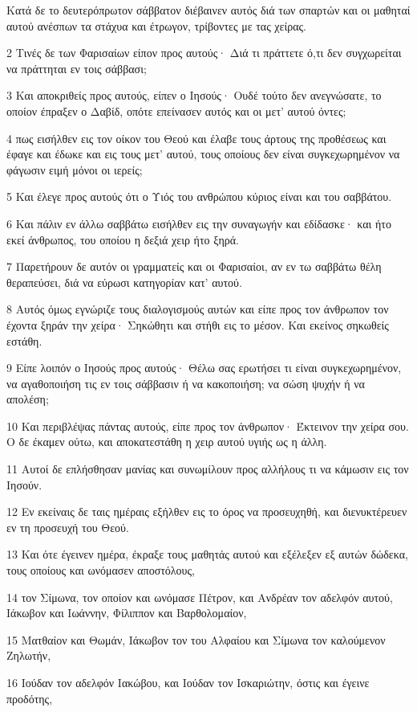 \par Κατά δε το δευτερόπρωτον σάββατον διέβαινεν αυτός διά των σπαρτών και οι μαθηταί αυτού ανέσπων τα στάχυα και έτρωγον, τρίβοντες με τας χείρας.
\par 2 Τινές δε των Φαρισαίων είπον προς αυτούς· Διά τι πράττετε ό,τι δεν συγχωρείται να πράττηται εν τοις σάββασι;
\par 3 Και αποκριθείς προς αυτούς, είπεν ο Ιησούς· Ουδέ τούτο δεν ανεγνώσατε, το οποίον έπραξεν ο Δαβίδ, οπότε επείνασεν αυτός και οι μετ' αυτού όντες;
\par 4 πως εισήλθεν εις τον οίκον του Θεού και έλαβε τους άρτους της προθέσεως και έφαγε και έδωκε και εις τους μετ' αυτού, τους οποίους δεν είναι συγκεχωρημένον να φάγωσιν ειμή μόνοι οι ιερείς;
\par 5 Και έλεγε προς αυτούς ότι ο Υιός του ανθρώπου κύριος είναι και του σαββάτου.
\par 6 Και πάλιν εν άλλω σαββάτω εισήλθεν εις την συναγωγήν και εδίδασκε· και ήτο εκεί άνθρωπος, του οποίου η δεξιά χειρ ήτο ξηρά.
\par 7 Παρετήρουν δε αυτόν οι γραμματείς και οι Φαρισαίοι, αν εν τω σαββάτω θέλη θεραπεύσει, διά να εύρωσι κατηγορίαν κατ' αυτού.
\par 8 Αυτός όμως εγνώριζε τους διαλογισμούς αυτών και είπε προς τον άνθρωπον τον έχοντα ξηράν την χείρα· Σηκώθητι και στήθι εις το μέσον. Και εκείνος σηκωθείς εστάθη.
\par 9 Είπε λοιπόν ο Ιησούς προς αυτούς· Θέλω σας ερωτήσει τι είναι συγκεχωρημένον, να αγαθοποιήση τις εν τοις σάββασιν ή να κακοποιήση; να σώση ψυχήν ή να απολέση;
\par 10 Και περιβλέψας πάντας αυτούς, είπε προς τον άνθρωπον· Έκτεινον την χείρα σου. Ο δε έκαμεν ούτω, και αποκατεστάθη η χειρ αυτού υγιής ως η άλλη.
\par 11 Αυτοί δε επλήσθησαν μανίας και συνωμίλουν προς αλλήλους τι να κάμωσιν εις τον Ιησούν.
\par 12 Εν εκείναις δε ταις ημέραις εξήλθεν εις το όρος να προσευχηθή, και διενυκτέρευεν εν τη προσευχή του Θεού.
\par 13 Και ότε έγεινεν ημέρα, έκραξε τους μαθητάς αυτού και εξέλεξεν εξ αυτών δώδεκα, τους οποίους και ωνόμασεν αποστόλους,
\par 14 τον Σίμωνα, τον οποίον και ωνόμασε Πέτρον, και Ανδρέαν τον αδελφόν αυτού, Ιάκωβον και Ιωάννην, Φίλιππον και Βαρθολομαίον,
\par 15 Ματθαίον και Θωμάν, Ιάκωβον τον του Αλφαίου και Σίμωνα τον καλούμενον Ζηλωτήν,
\par 16 Ιούδαν τον αδελφόν Ιακώβου, και Ιούδαν τον Ισκαριώτην, όστις και έγεινε προδότης,
